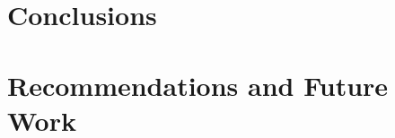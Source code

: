 \documentclass{erauthesis}
\begin{document}
\chapter{Conclusions}

% 

% 

% 


\chapter{Recommendations and Future Work} \label{chap:recommendations}
% 

\end{document}
